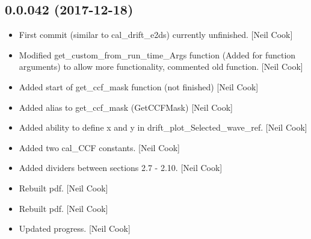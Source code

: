 \documentclass[a4paper,10pt,english]{report}
\begin{document}
\subsection{0.0.042 (2017-12-18)}
\label{\detokenize{misc/changelog:id508}}\begin{itemize}
\item {} 
First commit (similar to cal\_drift\_e2ds) \textendash{} currently unfinished.
{[}Neil Cook{]}

\item {} 
Modified get\_custom\_from\_run\_time\_Args function (Added for function
arguments) to allow more functionality, commented old function. {[}Neil
Cook{]}

\item {} 
Added start of get\_ccf\_mask function (not finished) {[}Neil Cook{]}

\item {} 
Added alias to get\_ccf\_mask (GetCCFMask) {[}Neil Cook{]}

\item {} 
Added ability to define x and y in drift\_plot\_Selected\_wave\_ref. {[}Neil
Cook{]}

\item {} 
Added two cal\_CCF constants. {[}Neil Cook{]}

\item {} 
Added dividers between sections 2.7 - 2.10. {[}Neil Cook{]}

\item {} 
Rebuilt pdf. {[}Neil Cook{]}

\item {} 
Rebuilt pdf. {[}Neil Cook{]}

\item {} 
Updated progress. {[}Neil Cook{]}

\end{itemize}
\end{document}
